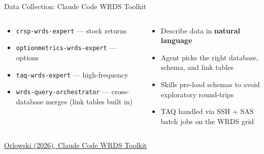 \documentclass[aspectratio=169, 11pt]{beamer}
\newcommand{\emphgold}[1]{\alert{\textbf{#1}}}
\newcommand{\sourceref}[1]{\vspace{0.15cm}\hfill{\tiny\textcolor{medgray}{#1}}}
\begin{document}
\begin{frame}[shrink=14]{Data Collection: Claude Code WRDS Toolkit}
\begin{columns}[T]
\begin{keyinsight}
\begin{itemize}
  \item \texttt{crsp-wrds-expert} --- stock returns
  \item \texttt{optionmetrics-wrds-expert} --- options
  \item \texttt{taq-wrds-expert} --- high-frequency
  \item \texttt{wrds-query-orchestrator} --- cross-database merges (link tables built in)
\end{itemize}
\end{keyinsight}

\begin{keyinsight}
\begin{itemize}
  \item Describe data in \emphgold{natural language}
  \item Agent picks the right database, schema, and link tables
  \item Skills pre-load schemas to avoid exploratory round-trips
  \item TAQ handled via SSH + SAS batch jobs on the WRDS grid
\end{itemize}
\end{keyinsight}
\end{columns}
\vspace{0.5cm}
\begin{center}
\end{center}
\sourceref{\href{https://github.com/piotrek-orlowski/claude-wrds-public}{Orlowski (2026), Claude Code WRDS Toolkit}}
\end{frame}
\end{document}
